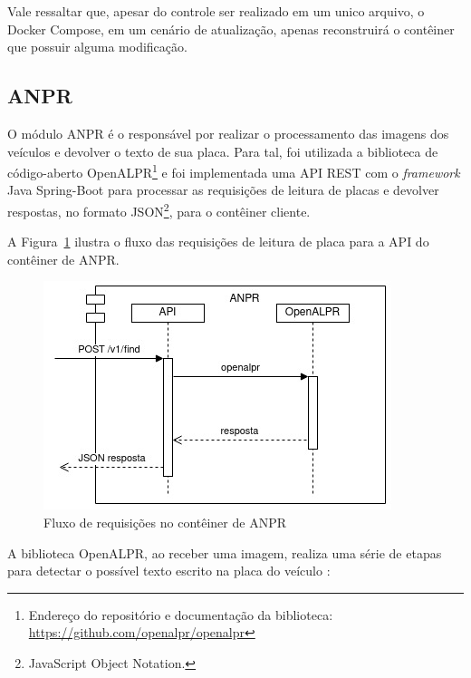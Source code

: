 \documentclass[12pt]{article}
\begin{document}
Vale ressaltar que, apesar do controle ser realizado em um unico arquivo, o Docker Compose, em um cenário de atualização, apenas reconstruirá o contêiner que possuir alguma modificação.

\subsection{ANPR}

O módulo ANPR é o responsável por realizar o processamento das imagens dos veículos e devolver o texto de sua placa. Para tal, foi utilizada a biblioteca de código-aberto OpenALPR\footnote{Endereço do repositório e documentação da biblioteca: \url{https://github.com/openalpr/openalpr}} e foi implementada uma API REST com o \textit{framework} Java Spring-Boot para processar as requisições de leitura de placas e devolver respostas, no formato JSON\footnote{JavaScript Object Notation.}, para o contêiner cliente.

A Figura~\ref{fig:anpr4j-data} ilustra o fluxo das requisições de leitura de placa para a API do contêiner de ANPR.

\begin{figure}[ht]
	\centering
	\includegraphics[width=.6
	\textwidth]{anpr4j-data.jpg}
	\caption{Fluxo de requisições no contêiner de ANPR}
	\label{fig:anpr4j-data}
\end{figure}

A biblioteca OpenALPR, ao receber uma imagem, realiza uma série de etapas para detectar o possível texto escrito na placa do veículo \cite{openalprdesign}:
\end{document}
